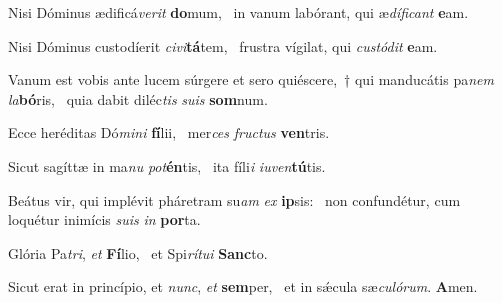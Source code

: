 \item Nisi Dóminus ædificá\textit{verit} \textbf{do}mum,~\psstar{} in vanum labórant, qui æ\textit{díficant} \textbf{e}am.

\item Nisi Dóminus custodíerit \textit{civi}\textbf{tá}tem,~\psstar{} frustra vígilat, qui \textit{custódit} \textbf{e}am.

\item Vanum est vobis ante lucem súrgere et sero quiéscere,~† qui manducátis pa\textit{nem} \textit{la}\textbf{bó}ris,~\psstar{} quia dabit diléc\textit{tis} \textit{suis} \textbf{som}num.

\item Ecce heréditas Dó\textit{mini} \textbf{fí}lii,~\psstar{} mer\textit{ces} \textit{fructus} \textbf{ven}tris.

\item Sicut sagíttæ in ma\textit{nu} \textit{pot}\textbf{én}tis,~\psstar{} ita fíli\textit{i} \textit{iuven}\textbf{tú}tis.

\item Beátus vir, qui implévit pháretram su\textit{am} \textit{ex} \textbf{ip}sis:~\psstar{} non confundétur, cum loquétur inimícis \textit{suis} \textit{in} \textbf{por}ta.

\item Glória Pa\textit{tri}, \textit{et} \textbf{Fí}lio,~\psstar{} et Spi\textit{rítui} \textbf{Sanc}to.

\item Sicut erat in princípio, et \textit{nunc}, \textit{et} \textbf{sem}per,~\psstar{} et in sǽcula sæ\textit{culórum}. \textbf{A}men.